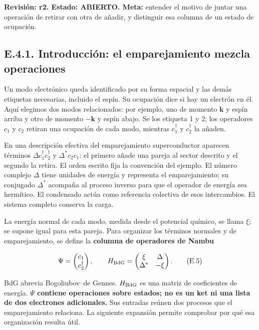 \documentclass[
  spanish,
  10pt,
  a4paper,
]{article}
\begin{document}
\textbf{Revisión: r2. Estado: ABIERTO. Meta:} entender el motivo de
juntar una operación de retirar con otra de añadir, y distinguir esa
columna de un estado de ocupación.

\subsection{E.4.1. Introducción: el emparejamiento mezcla
operaciones}\label{e.4.1.-introducciuxf3n-el-emparejamiento-mezcla-operaciones}

Un modo electrónico queda identificado por su forma espacial y las demás
etiquetas necesarias, incluido el espín. Su ocupación dice si hay un
electrón en él. Aquí elegimos dos modos relacionados: por ejemplo, uno
de momento \(\mathbf k\) y espín arriba y otro de momento \(-\mathbf k\)
y espín abajo. Se los etiqueta 1 y 2; los operadores \(c_1\) y \(c_2\)
retiran una ocupación de cada modo, mientras \(c_1^\dagger\) y
\(c_2^\dagger\) la añaden.

En una descripción efectiva del emparejamiento superconductor aparecen
términos \(\Delta c_1^\dagger c_2^\dagger\) y \(\Delta^*c_2c_1\): el
primero añade una pareja al sector descrito y el segundo la retira. El
orden escrito fija la convención del ejemplo. El número complejo
\(\Delta\) tiene unidades de energía y representa el emparejamiento; su
conjugado \(\Delta^*\) acompaña al proceso inverso para que el operador
de energía sea hermítico. El condensado actúa como referencia colectiva
de esos intercambios. El sistema completo conserva la carga.

La energía normal de cada modo, medida desde el potencial químico, se
llama \(\xi\); se supone igual para esta pareja. Para organizar los
términos normales y de emparejamiento, se define la \textbf{columna de
operadores de Nambu}

\[
\Psi=\begin{pmatrix}c_1\\c_2^\dagger\end{pmatrix},\qquad
H_{\rm BdG}=\begin{pmatrix}\xi&\Delta\\\Delta^*&-\xi\end{pmatrix}.
\tag{E.5}
\]

BdG abrevia Bogoliubov--de Gennes. \(H_{\rm BdG}\) es una matriz de
coeficientes de energía. \textbf{\(\Psi\) contiene operaciones sobre
estados; no es un ket ni una lista de dos electrones adicionales.} Sus
entradas reúnen dos procesos que el emparejamiento relaciona. La
siguiente expansión permite comprobar por qué esa organización resulta
útil.
\end{document}
